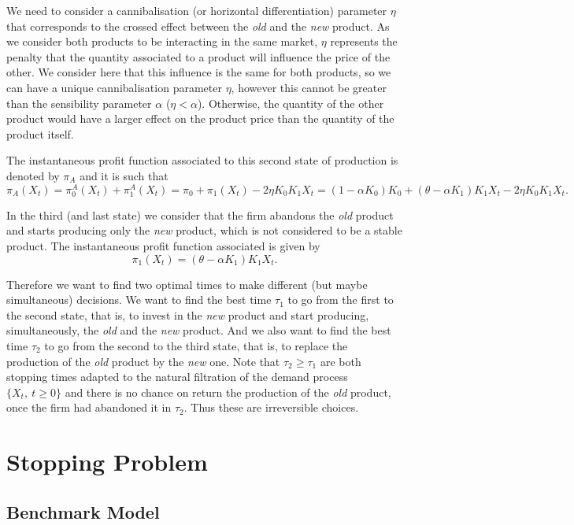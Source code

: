 We need to consider a cannibalisation (or horizontal differentiation) parameter $\eta$ that corresponds to the crossed effect between the \textit{old} and the \textit{new} product. As we consider both products to be interacting in the same market, $\eta$ represents the penalty that the quantity
associated to a product will influence the price of the other. We consider here
that this influence is the same for both products, so we can have a unique cannibalisation parameter $\eta$, however this cannot be greater than the sensibility parameter $\alpha$ ($\eta<\alpha$). Otherwise, the quantity
of the other product would have a larger effect on the product price than the quantity of the product itself.

The instantaneous profit function associated to this second state of production is denoted by $\pi_A$ and it is such that
$$\pi_A(X_t)=\pi_0^A(X_t)+\pi_1^A(X_t)= \pi_0+\pi_1(X_t)-2\eta K_0 K_1 X_t=(1-\alpha K_0)K_0+(\theta-\alpha K_1)K_1X_t-2\eta K_0 K_1 X_t.$$

In the third (and last state) we consider that the firm abandons the \textit{old} product and starts producing only the \textit{new} product, which is not considered to be a stable product. The instantaneous profit function associated is given by
$$\pi_1(X_t)=(\theta-\alpha K_1)K_1X_t.$$


Therefore we want to find two optimal times to make different (but maybe simultaneous) decisions. We want to find the best time $\tau_1$ to go from the first to the second state, that is, to invest in the \textit{new} product and start producing, simultaneously, the \textit{old} and the \textit{new} product. And we also want to find the best time $\tau_2$ to go from the second to the third state, that is, to replace the production of the \textit{old} product by the \textit{new} one. Note that $\tau_2 \geq \tau_1$ are both stopping times adapted to the natural filtration of the demand process $\{ X_t, \ t\geq0 \}$ and there is no chance on return the production of the \textit{old} product, once the firm had abandoned it in $\tau_2$. Thus these are irreversible choices.

\section{Stopping Problem}
\label{section:2_theory}



\subsection{Benchmark Model}
\label{subsec:2_bm}


